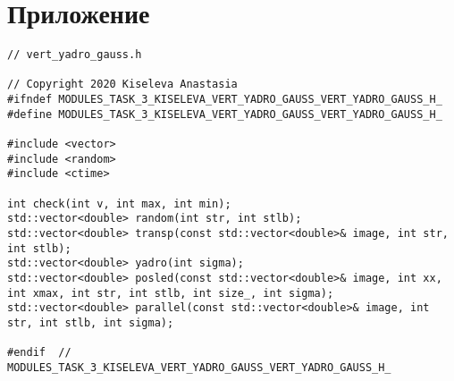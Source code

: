 \documentclass{report}
\begin{document}
\section*{Приложение}
\begin{lstlisting}
// vert_yadro_gauss.h

// Copyright 2020 Kiseleva Anastasia
#ifndef MODULES_TASK_3_KISELEVA_VERT_YADRO_GAUSS_VERT_YADRO_GAUSS_H_
#define MODULES_TASK_3_KISELEVA_VERT_YADRO_GAUSS_VERT_YADRO_GAUSS_H_

#include <vector>
#include <random>
#include <ctime>

int check(int v, int max, int min);
std::vector<double> random(int str, int stlb);
std::vector<double> transp(const std::vector<double>& image, int str, int stlb);
std::vector<double> yadro(int sigma);
std::vector<double> posled(const std::vector<double>& image, int xx, int xmax, int str, int stlb, int size_, int sigma);
std::vector<double> parallel(const std::vector<double>& image, int str, int stlb, int sigma);

#endif  // MODULES_TASK_3_KISELEVA_VERT_YADRO_GAUSS_VERT_YADRO_GAUSS_H_


\end{lstlisting}
\end{document}
